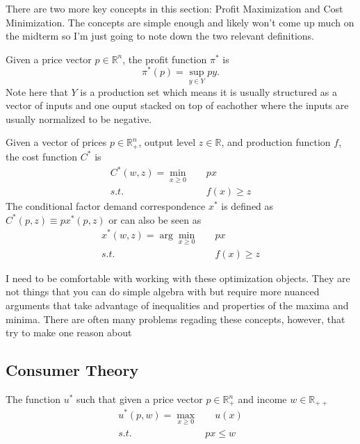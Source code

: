 \documentclass[11pt,english]{article}
\begin{document}
There are two more key concepts in this section: Profit Maximization and Cost Minimization. The concepts are simple enough and likely won't come up much on the midterm so I'm just going to note down the two relevant definitions.

\begin{definition}
Given a price vector $p\in \mathbb{R}^n$, the profit function $\pi^*$ is $$\pi^*(p) = \sup_{y\in Y} py.$$ Note here that $Y$ is a production set which means it is usually structured as a vector of inputs and one ouput stacked on top of eachother where the inputs are usually normalized to be negative.
\end{definition}

\begin{definition}
Given a vector of prices $p\in \mathbb{R}^n_+$, output level $z\in \mathbb{R}$, and production function $f$, the cost function $C^*$ is \begin{align*}
C^*(w,z) = \min_{x \geq 0}&\quad px\\
s.t.&\quad f(x) \geq z
\end{align*}
The conditional factor demand correspondence $x^*$ is defined as $C^*(p,z) \equiv p x^*(p,z)$ or can also be seen as \begin{align*}
x^*(w,z) = \arg\min_{x \geq 0}&\quad px\\
s.t.&\quad f(x) \geq z
\end{align*}
\end{definition}

I need to be comfortable with working with these optimization objects. They are not things that you can do simple algebra with but require more nuanced arguments that take advantage of inequalities and properties of the maxima and minima. There are often many problems regading these concepts, however, that try to make one reason about 

\subsection{Consumer Theory}

\begin{definition}
The function $u^*$ such that given a price vector $p \in \mathbb{R}_+^n$ and income $w \in \mathbb{R}_{++}$ \begin{align*}
u^*(p,w) = \max_{x \geq 0} & \quad u(x)\\
s.t. \quad & px \leq w
\end{align*}
\end{definition}
\end{document}
